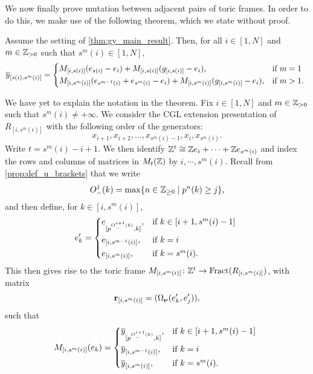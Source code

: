 We now finally prove mutation between adjacent pairs of toric frames. In order to do
this, we make use of the following theorem, which we state without proof.
\begin{theorem}\label{thm:mutation_for_bracket_frames}
	Assume the setting of \cref{thm:gy_main_result}. Then, for all $i \in [1, N]$ and $m \in \mathbb{Z}_{> 0}$ such that $s^m(i) \in [1, N]$,
	\begin{equation*}
		\oy_{[s(i), s^m(i)]} = \begin{dcases*}
			M_{[i, s(i)]}(e_{s(i)} - e_i) + M_{[i, s(i)]}(g_{[i, s(i)]} - e_i),                         & if $m=1$    \\
			M_{[i, s^m(i)]}(e_{s^{m-1}(i)} + e_{s^m(i)} -e_i) + M_{[i, s^m(i)]}(g_{[i, s^m(i)]} - e_i), & if $m > 1$.
		\end{dcases*}
	\end{equation*}
\end{theorem}
%
We have yet to explain the notation in the theorem. Fix $i \in [1, N]$ and $m\in
	\mathbb{Z}_{>0}$ such that $s^m(i) \neq +\infty$. We consider the CGL extension presentation
of $R_{[i, s^m(i)]}$ with the following order of the generators:
\begin{equation*}
	x_{i+1}, x_{i+2}, \dots, x_{s^m(i) - 1}, x_i, x_{s^m(i)}.
\end{equation*}
%
Write $t = s^m(i)-i +1$. We then identify $\mathbb{Z}^t \cong \mathbb{Z} e_i + \cdots + \mathbb{Z}
	e_{s^m(i)}$ and index the rows and columns of matrices in $M_t(\mathbb{Z})$ by $i, \cdots,
	s^m(i)$. Recall from \cref{prop:def_u_brackets} that we write
\begin{equation*}
	O_{-}^j(k) = \max \{n \in \mathbb{Z}_{\geq 0} \mid p^n(k) \geq j\},
\end{equation*}
and then define, for $k \in [i, s^m(i)]$,
\begin{equation*}
	e'_k = \begin{dcases*}
		e_{[p^{O^{i+1}_{-}(k)}, k]}, & if $k \in [i+1, s^m(i) - 1]$ \\
		e_{[i, s^{m-1}(i)]},         & if $k=i$                     \\
		e_{[i, s^m(i)]},             & if $k = s^m(i)$.
	\end{dcases*}
\end{equation*}
%
This then gives rise to the toric frame $M_{[i, s^m(i)]}\colon \mathbb{Z}^t \to \operatorname{Fract}(R_{[i,
				s^m(i)]})$, with matrix
\begin{equation*}
	\mathbf{r}_{[i, s^m (i)]} = (\Omega_{\boldsymbol{\nu}}(e'_k,e'_j)),
\end{equation*}
such that
\begin{equation*}
	M_{[i, s^m(i)]}(e_k) = \begin{dcases*}
		\oy_{[p^{O^{i+1}_{-}(k)}, k]}, & if $k \in [i+1, s^m(i) - 1]$ \\
		\oy_{[i, s^{m-1}(i)]},         & if $k=i$                     \\
		\oy_{[i, s^m(i)]},             & if $k = s^m(i)$.
	\end{dcases*}
\end{equation*}

